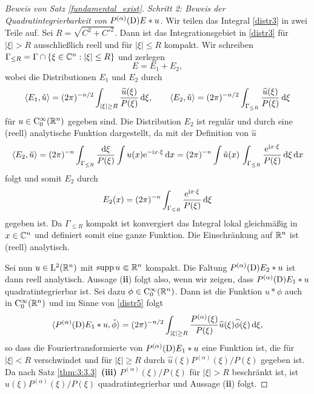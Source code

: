 \begin{proof}[Beweis von Satz \ref{fundamental_exist}]
\medskip
\noindent
{\em Schritt 2: Beweis der Quadratintegrierbarkeit von $P^{(\alpha)}(\mathrm D) E * u$.}
Wir teilen das Integral \eqref{distr3} in zwei Teile auf. Sei $R=\sqrt{C^2 + C'^2}$. Dann ist das Integrationsgebiet in \eqref{distr3} für $|\xi|>R$ ausschließlich reell 
und für $|\xi|\le R$ kompakt. Wir schreiben $\Gamma_{\le R} = \Gamma\cap\{\xi\in\mathbb C^n : |\xi|\le R\}$ und zerlegen
\begin{equation}\label{distr4}
E=E_1 + E_2,
\end{equation}
wobei die Distributionen $E_1$ und $E_2$ durch
\begin{equation}\label{distr5}
\langle E_1,\check u\rangle = (2\pi)^{-n/2} \int_{|\xi|\ge R} \frac{\widehat u(\xi)}{P(\xi)}\,\mathrm d\xi, \qquad 
\langle E_2, \check u\rangle = (2\pi)^{-n/2} \int_{\Gamma_{\le R}} \frac{\widehat u(\xi)}{P(\xi)}\,\mathrm d \xi
\end{equation}
für $u\in\mathrm C_0^\infty(\mathbb R^n)$ gegeben sind. Die Distribution $E_2$ ist regulär und durch eine (reell) analytische 
Funktion dargestellt, da mit der Definition von $\widehat u$
\begin{equation}
\langle E_2, \check u\rangle = (2\pi)^{-n} \int_{\Gamma_{\le R}} \frac{\mathrm d\xi}{P(\xi)} \int u(x) \mathrm e^{-\mathrm i x\cdot\xi}\,\mathrm d x= (2\pi)^{-n} \int \check u(x) \, \int_{\Gamma_{\le R}}\frac{\mathrm e^{\mathrm i x\cdot \xi}}{P(\xi)}\,\mathrm d \xi \,\mathrm d x
\end{equation}
folgt und somit $E_2$ durch
\begin{equation}
 E_2(x) = (2\pi)^{-n} \int_{\Gamma_{\le R}} \frac{\mathrm e^{\mathrm i x\cdot \xi}}{P(\xi)}\,\mathrm d \xi
\end{equation}
gegeben ist. Da $\Gamma_{\le R}$ kompakt ist konvergiert das Integral lokal gleichmäßig in $x\in\mathbb C^n$ und definiert somit eine ganze Funktion. Die Einschränkung auf $\mathbb R^n$ ist (reell) analytisch. 

Sei nun $u\in \mathrm L^2(\mathbb R^n)$ mit $\operatorname{supp} u\Subset\mathbb R^n$ kompakt. Die Faltung $P^{(\alpha)}(\mathrm D)E_2 *u$ ist dann reell analytisch.  Aussage ({\bf ii}) folgt also, wenn wir zeigen, dass $P^{(\alpha)}(\mathrm D) E_1 * u$ quadratintegrierbar ist.  Sei  dazu $\phi \in\mathrm C_0^\infty(\mathbb R^n)$. Dann ist die Funktion $u*\phi$ auch in $\mathrm C_0^\infty(\mathbb R^n)$ und im Sinne von \eqref{distr5} folgt
\begin{equation}
\langle P^{(\alpha)} (\D) E_1 * u, \check \phi\rangle  %
=(2\pi)^{-n/2} \int_{|\xi|\ge R} \frac{P^{(\alpha)}(\xi)}{P(\xi)} \widehat u(\xi) \widehat \phi(\xi) \d \xi,
\end{equation}     
so dass die Fouriertransformierte von $P^{(\alpha)}(\mathrm D) E_1 * u$ eine Funktion ist, die für $|\xi|<R$ verschwindet und für $|\xi|\ge R$ durch $\widehat u(\xi)P^{(\alpha)}(\xi)/P(\xi)$ gegeben ist. Da nach Satz \ref{thm:3:3.3}~{\bf (iii)} $P^{ (\alpha)}(\xi)/P(\xi)$ für $|\xi|>R$ beschränkt ist, ist  $\widehat u(\xi)P^{(\alpha)}(\xi)/P(\xi)$
quadratintegrierbar und Aussage ({\bf ii}) folgt.


\end{proof}
